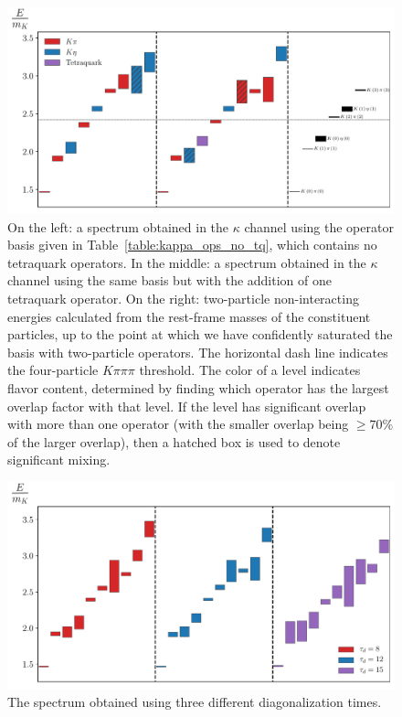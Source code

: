 \begin{figure}
  \centering
  \hspace*{-0.5in}\includegraphics[width=\textwidth]{figures/spectrum_a1g/staircase.pdf}
  \caption{On the left: a spectrum obtained in the $\kappa$ channel using the operator basis given in Table~\ref{table:kappa_ops_no_tq}, which contains no tetraquark operators. In the middle: a spectrum obtained in the $\kappa$ channel using the same basis but with the addition of one tetraquark operator. On the right: two-particle non-interacting energies calculated from the rest-frame masses of the constituent particles, up to the point at which we have confidently saturated the basis with two-particle operators. The horizontal dash line indicates the four-particle $K\pi\pi\pi$ threshold. The color of a level indicates flavor content, determined by finding which operator has the largest overlap factor with that level. If the level has significant overlap with more than one operator (with the smaller overlap being $\geq 70\%$ of the larger overlap), then a hatched box is used to denote significant mixing.}
  \label{fig:kappa_spectrum}
\end{figure}

\begin{figure}
  \centering
  \hspace*{-0.5in}\includegraphics[width=\textwidth]{figures/spectrum_a1g/staircase_tau_d.pdf}
  \caption{The spectrum obtained using three different diagonalization times.}
  \label{fig:spectrum_td}
\end{figure}

